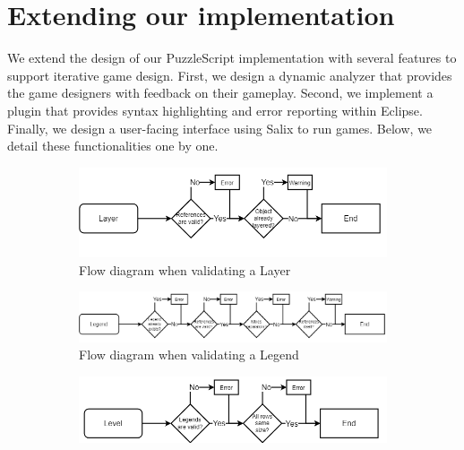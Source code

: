 \section{Extending our implementation}
We extend the design of our PuzzleScript implementation with several features to support iterative game design. First, we design a dynamic analyzer that provides the game designers with feedback on their gameplay. Second, we implement a plugin that provides syntax highlighting and error reporting within Eclipse. Finally, we design a user-facing interface using Salix to run games. Below, we detail these functionalities one by one. 






\begin{figure}[ht]
    \label{fig:checker_remaining}
    \begin{subfigure}{1\textwidth}
        \centering
        \includegraphics[scale=0.45]{images/checker/Layer.png}
        \caption{Flow diagram when validating a Layer}
    \end{subfigure}
    \begin{subfigure}{1\textwidth}
        \centering
        \includegraphics[scale=0.45]{images/checker/Legend.png}
        \caption{Flow diagram when validating a Legend}
    \end{subfigure}
    \begin{subfigure}{1\textwidth}
        \centering
        \includegraphics[scale=0.45]{images/checker/Level.png}

\end{subfigure}
\end{figure}
